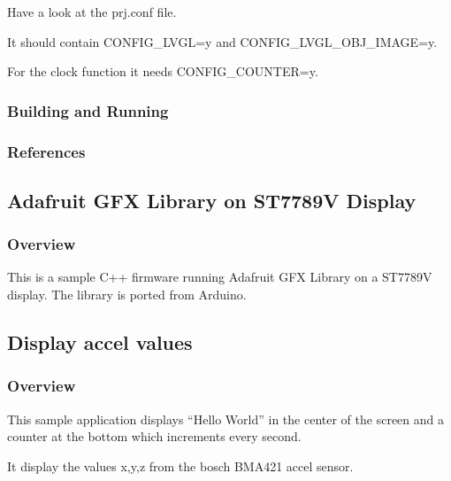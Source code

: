\documentclass[letterpaper,10pt,english]{sphinxmanual}
\begin{document}
Have a look at the prj.conf file.

It should contain CONFIG\_LVGL=y and
CONFIG\_LVGL\_OBJ\_IMAGE=y.

For the clock function it needs  CONFIG\_COUNTER=y.


\subsubsection{Building and Running}
\label{\detokenize{samples/gui/clock/README:building-and-running}}

\subsubsection{References}
\label{\detokenize{samples/gui/clock/README:references}}

\subsection{Adafruit GFX Library on ST7789V Display}
\label{\detokenize{samples/gui/gfx/README:adafruit-gfx-library-on-st7789v-display}}\label{\detokenize{samples/gui/gfx/README:gfx-sample}}\label{\detokenize{samples/gui/gfx/README::doc}}

\subsubsection{Overview}
\label{\detokenize{samples/gui/gfx/README:overview}}
This is a sample C++ firmware running Adafruit GFX Library on a ST7789V display. The library is ported from Arduino.


\subsection{Display accel values}
\label{\detokenize{samples/gui/lvaccel/README:display-accel-values}}\label{\detokenize{samples/gui/lvaccel/README:lvaccel-sample}}\label{\detokenize{samples/gui/lvaccel/README::doc}}

\subsubsection{Overview}
\label{\detokenize{samples/gui/lvaccel/README:overview}}
This sample application displays “Hello World” in the center of the screen
and a counter at the bottom which increments every second.

It display the values x,y,z from the bosch BMA421 accel sensor.
\end{document}
